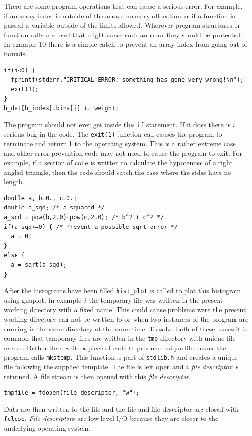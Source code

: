 \documentclass[11pt]{scrartcl}
\begin{document}
There are some program operations that can cause a serious error.
For example, if an array index is outside of the arrays memory
allocation or if a function is passed a variable outside of the limits
allowed.  Wherever program structures or function calls are used
that might cause such an error they should be protected.  In example
10 there is a simple catch to prevent an array index from going out of
bounds.
\begin{lstlisting}
if(i<0) {
  fprintf(stderr,"CRITICAL ERROR: something has gone very wrong!\n");
  exit(1);
}
h_dat[h_index].bins[i] += weight;
\end{lstlisting}
The program should not ever get inside this \texttt{if} statement.  If
it does there is a serious bug in the code.  The \texttt{exit(1)}
function call causes the program to terminate and return 1 to the
operating system.  This is a rather extreme case and other error
prevention code may not need to cause the program to exit.  For
example, if a section of code is written to calculate the hypotenuse
of a right angled triangle, then the code should catch the case where
the sides have no length.
\begin{lstlisting}
double a, b=0., c=0.;
double a_sqd; /* a squared */
a_sqd = pow(b,2.0)+pow(c,2.0); /* b^2 + c^2 */
if(a_sqd<=0) { /* Prevent a possible sqrt error */
  a = 0;
}
else {
  a = sqrt(a_sqd);
}
\end{lstlisting}

After the histograms have been filled \texttt{hist\_plot} is called to
plot this histogram using gnuplot.  In example 9 the temporary file
was written in the present working directory with a fixed name.  This
could cause problems were the present working directory can not be
written to or when two instances of the program are running in the
same directory at the same time.  To solve both of these issues it is
common that temporary files are written in the \texttt{\/tmp}
directory with unique file names.  Rather than write a piece of code
to produce unique file names the program calls \texttt{mkstemp}.  This
function is part of \texttt{stdlib.h} and creates a unique file
following the supplied template.  The file is left open and a {\em
file descriptor} is returned.  A file stream is then opened with this {\em
file descriptor}.
\begin{lstlisting}
tmpfile = fdopen(file_descriptor, "w");
\end{lstlisting}
Data are then written to the file and the file and file descriptor are
closed with \texttt{fclose}.  {\em
File descriptor}s are low level I/O because they are
closer to the underlying operating system.
\end{document}
